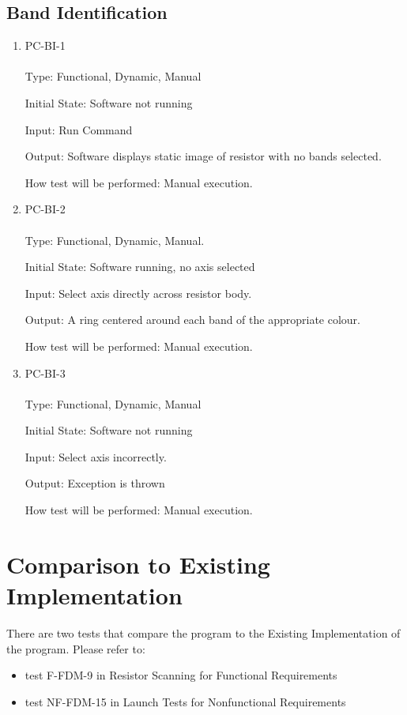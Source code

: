 \documentclass[12pt, titlepage]{article}
\begin{document}
\subsection{Band Identification}
\begin{enumerate}
\item{PC-BI-1\\}
\\
Type: Functional, Dynamic, Manual
					
Initial State: Software not running
					
Input: Run Command
					
Output: Software displays static image of resistor with no bands selected.
					
How test will be performed: Manual execution.
					
\item{PC-BI-2\\}
\\
Type: Functional, Dynamic, Manual.
					
Initial State: Software running, no axis selected
					
Input: Select axis directly across resistor body.
					
Output:  A ring centered around each band of the appropriate colour.
					
How test will be performed:  Manual execution.

\item{PC-BI-3\\}
\\
Type: Functional, Dynamic, Manual
					
Initial State: Software not running
					
Input: Select axis incorrectly.
					
Output: Exception is thrown
					
How test will be performed: Manual execution.

\end{enumerate}

\section{Comparison to Existing Implementation}
There are two tests that compare the program to the Existing Implementation of the program. Please refer to:
\begin{itemize}
\item test F-FDM-9 in Resistor Scanning for Functional Requirements
\item test NF-FDM-15 in Launch Tests for Nonfunctional Requirements 
\end{itemize}
\end{document}
